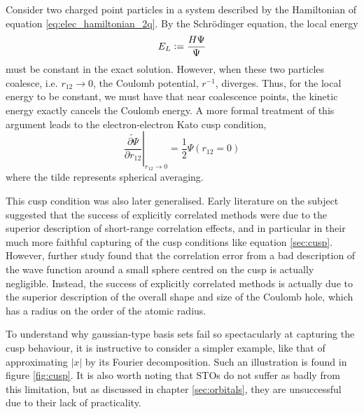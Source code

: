 Consider two charged point particles in a system described by the Hamiltonian of equation \eqref{eq:elec_hamiltonian_2q}. By the Schr\"odinger equation, the local energy
\begin{equation}
    E_L\mathrel{\mathop:}= \frac{H\Psi}{\Psi}
\end{equation}
must be constant in the exact solution. However, when these two particles coalesce, i.e. $r_{12}\to 0$, the Coulomb potential, $r^{-1}$, diverges. Thus, for the local energy to be constant, we must have that near coalescence points, the kinetic energy exactly cancels the Coulomb energy. A more formal treatment of this argument leads to the electron-electron Kato cusp condition,\cite{katoEigenfunctionsManyparticleSystems1957a}
\begin{equation}
    \label{eq:cusp}
    \left.\widetilde{\frac{\partial \Psi}{\partial r_{12}}}\right|_{r_{12}\to 0}
    = \frac 12 \Psi(r_{12}=0)
\end{equation}
where the tilde represents spherical averaging.

This cusp condition was also later generalised.\cite{packCuspConditionsMolecular1966,kurokawaChapterTwoGeneral2016}
Early literature on the subject suggested that the success of explicitly correlated methods were due to the superior description of short-range correlation effects, and in particular in their much more faithful capturing of the cusp conditions like equation \ref{sec:cusp}.\cite{roothaanAnalytical1960,watsonApproximate1960,weissConfiguration1961,schwartzGround1962}
However, further study found that the correlation error from a bad description of the wave function around a small sphere centred on the cusp is actually negligible.\cite{coulsonElectron1961,gilbertInterpretation1963,prendergastImpact2001,klopperR122007} Instead, the success of explicitly correlated methods is actually due to the superior description of the overall shape and size of the Coulomb hole, which has a radius on the order of the atomic radius.

To understand why gaussian-type basis sets fail so spectacularly at capturing the cusp behaviour, it is instructive to consider a simpler example, like that of approximating $|x|$ by its Fourier decomposition. Such an illustration is found in figure \ref{fig:cusp}. It is also worth noting that \glspl{STO} do not suffer as badly from this limitation,\cite{kongExplicitly2011} but as discussed in chapter \ref{sec:orbitals}, they are unsuccessful due to their lack of practicality.

